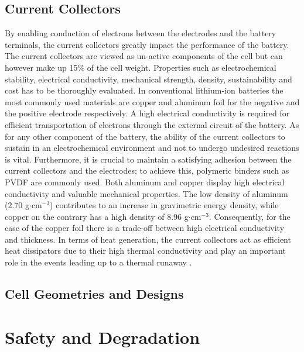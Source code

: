 \subsection{Current Collectors}
\label{sec:current-collectors}
By enabling conduction of electrons between the electrodes and the battery terminals, the current collectors greatly impact the performance of the battery. The current collectors are viewed as un-active components of the cell but can however make up 15\% of the cell weight. Properties such as electrochemical stability, electrical conductivity, mechanical strength, density, sustainability and cost has to be thoroughly evaluated. In conventional lithium-ion batteries the most commonly used materials are copper and aluminum foil for the negative and the positive electrode respectively. A high electrical conductivity is required for efficient transportation of electrons through the external circuit of the battery. As for any other component of the battery, the ability of the current collectors to sustain in an electrochemical environment and not to undergo undesired reactions is vital. Furthermore, it is crucial to maintain a satisfying adhesion between the current collectors and the electrodes; to achieve this, polymeric binders such as PVDF are commonly used. Both aluminum and copper display high electrical conductivity and valuable mechanical properties. The low density of aluminum (2.70 g$\cdot$cm$^{-3}$) contributes to an increase in gravimetric energy density, while copper on the contrary has a high density of 8.96 g$\cdot$cm$^{-3}$. Consequently, for the case of the copper foil there is a trade-off between high electrical conductivity and thickness. In terms of heat generation, the current collectors act as efficient heat dissipators due to their high thermal conductivity and play an important role in the events leading up to a thermal runaway \cite{zhu2021review}.

\subsection{Cell Geometries and Designs}
\label{sec:cell-geometries-designs}


\section{Safety and Degradation}
\label{sec:safety-degradation}

